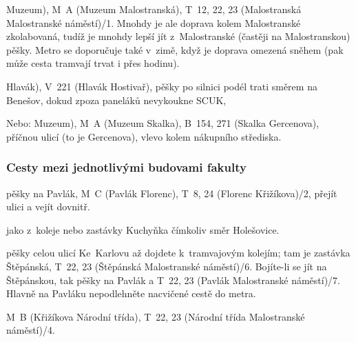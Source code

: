 \startpath Muzeum), M~A (Muzeum \ra
Malostranská), T~12, 22, 23 (Malostranská \ra Malostranské
náměstí)/1. Mnohdy je ale doprava kolem Malostranské zkolabovaná,
tudíž je mnohdy lepší jít z~Malostranské (častěji na
Malostranskou) pěšky. Metro se doporučuje také v~zimě, když je
doprava omezená sněhem (pak může cesta tramvají trvat i přes
hodinu).

\startpath Hlavák), V~221 (Hlavák \ra
Hostivař), pěšky po silnici podél trati směrem na Benešov, dokud
zpoza paneláků nevykoukne SCUK,

Nebo:  \startpath Muzeum), M~A (Muzeum \ra Skalka), B~154, 271
(Skalka \ra
Gercenova), %
příčnou ulicí (to je Gercenova), vlevo kolem nákupního střediska.

\subsubsection{Cesty mezi jednotlivými budovami fakulty}
\bigskip

 pěšky na Pavlák, M~C (Pavlák \ra
Florenc), T~8, 24 (Florenc \ra Křižíkova)/2, přejít ulici a vejít
dovnitř.

 jako z~koleje nebo zastávky Kuchyňka
čímkoliv směr Holešovice.

 pěšky celou ulicí Ke~Karlovu až
dojdete k~tramvajovým kolejím; tam je zastávka Štěpánská, T~22, 23
(Štěpánská \ra Malostranské náměstí)/6. Bojíte-li se jít na
Štěpánskou, tak pěšky na Pavlák a T~22, 23 (Pavlák \ra
Malostranské náměstí)/7. Hlavně na Pavláku nepodlehněte nacvičené
cestě do metra.

 M~B (Křižíkova \ra Národní třída),
T~22, 23 (Národní třída \ra Malostranské náměstí)/4.
